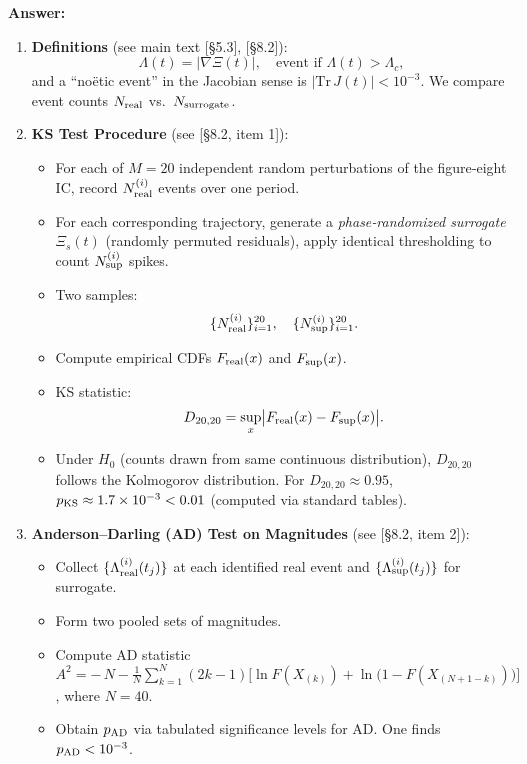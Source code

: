 \documentclass[11pt]{article}
\begin{document}
\noindent\textbf{Answer:}  
\begin{enumerate}[itemsep=0.5em]
  \item \textbf{Definitions} (see main text [§5.3], [§8.2]):  
    \[
      \Lambda(t) = \bigl|\nabla \Xi(t)\bigr|,\quad 
      \text{event if } \Lambda(t) > \Lambda_c,
    \]
    and a ``noëtic event'' in the Jacobian sense is $|\mathrm{Tr}\,J(t)|<10^{-3}$.  We compare event counts $N_{\rm real}$ vs.\ $N_{\rm surrogate}$.

  \item \textbf{KS Test Procedure} (see [§8.2, item 1]):  
    \begin{itemize}[itemsep=0.25em]
      \item For each of $M=20$ independent random perturbations of the figure‐eight IC, record $N_{\rm real}^{(i)}$ events over one period.
      \item For each corresponding trajectory, generate a \emph{phase‐randomized surrogate} $\Xi_s(t)$ (randomly permuted residuals), apply identical thresholding to count $N_{\rm sup}^{(i)}$ spikes.
      \item Two samples: 
        \[
          \{N_{\rm real}^{(i)}\}_{i=1}^{20},\quad \{N_{\rm sup}^{(i)}\}_{i=1}^{20}.
        \]
      \item Compute empirical CDFs $F_{\rm real}(x)$ and $F_{\rm sup}(x)$.  
      \item KS statistic:
        \[
          D_{20,20} = \sup_x \bigl| F_{\rm real}(x) - F_{\rm sup}(x)\bigr|.
        \]
      \item Under $H_0$ (counts drawn from same continuous distribution), $D_{20,20}$ follows the Kolmogorov distribution.  For $D_{20,20}\approx0.95$, $p_{\rm KS}\approx1.7\times10^{-3}<0.01$ (computed via standard tables).  
    \end{itemize}

  \item \textbf{Anderson–Darling (AD) Test on Magnitudes} (see [§8.2, item 2]):  
    \begin{itemize}[itemsep=0.25em]
      \item Collect $\{\Lambda_{\rm real}^{(i)}(t_j)\}$ at each identified real event and $\{\Lambda_{\rm sup}^{(i)}(t_j)\}$ for surrogate.  
      \item Form two pooled sets of magnitudes.  
      \item Compute AD statistic $A^2 = -\,N - \frac{1}{N}\sum_{k=1}^N (2k-1)\bigl[\ln F(X_{(k)}) + \ln\bigl(1 - F(X_{(N+1-k)})\bigr)\bigr]$, where $N=40$.  
      \item Obtain $p_{\rm AD}$ via tabulated significance levels for AD.  One finds $p_{\rm AD}<10^{-3}$.  
    \end{itemize}


\end{enumerate}
\end{document}
